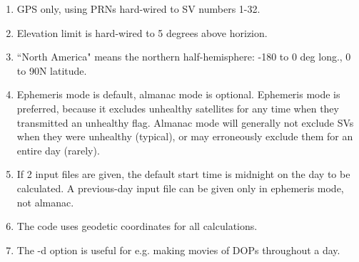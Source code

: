 \begin{enumerate}
\item GPS only, using PRNs hard-wired to SV numbers 1-32.
\item Elevation limit is hard-wired to 5 degrees above horizion.
\item ``North America" means the northern half-hemisphere: -180 to 0 deg long.,
      0 to 90N latitude.
\item Ephemeris mode is default, almanac mode is optional.  Ephemeris mode is
      preferred, because it excludes unhealthy satellites for any time when they
      transmitted an unhealthy flag.  Almanac mode will generally not exclude SVs
      when they were unhealthy (typical), or may erroneously exclude them for an
      entire day (rarely).
\item If 2 input files are given, the default start time is midnight on the day
      to be calculated.  A previous-day input file can be given only in ephemeris
      mode, not almanac.
\item The code uses geodetic coordinates for all calculations.
\item The -d option is useful for e.g. making movies of DOPs throughout a day.
\end{enumerate}
%

